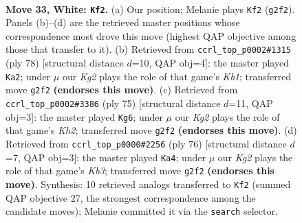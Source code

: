 \documentclass[11pt]{article}
\begin{document}
\clearpage

\begin{figure}[p]\centering
\begin{subfigure}{0.46\textwidth}\centering
\resizebox{\linewidth}{!}{%
\newchessgame
\chessboard[
  setfen={r7/6k1/8/8/p5p1/P7/6KP/R7 w - - 0 33},
  showmover=false,
  pgfstyle=straightmove, color=movearrow, markmove={g2-f2}
]}
\caption{}
\end{subfigure}\hfill
\begin{subfigure}{0.46\textwidth}\centering
\resizebox{\linewidth}{!}{%
\newchessgame
\chessboard[
  setfen={8/8/1k6/8/1p2r3/8/1PPR4/1K6 w - - 0 40},
  showmover=false,
  pgfstyle=straightmove, color=movearrow, markmove={b1-a2}
]}
\caption{}
\end{subfigure}
\\[4pt]
\begin{subfigure}{0.46\textwidth}\centering
\resizebox{\linewidth}{!}{%
\newchessgame
\chessboard[
  setfen={8/6pk/8/6Pp/R6P/1r6/5P1K/8 b - - 4 38},
  showmover=false,
  pgfstyle=straightmove, color=movearrow, markmove={h7-g6}
]}
\caption{}
\end{subfigure}\hfill
\begin{subfigure}{0.46\textwidth}\centering
\resizebox{\linewidth}{!}{%
\newchessgame
\chessboard[
  setfen={5k2/5p2/1pr5/8/1P6/1K6/4RP2/8 w - - 0 39},
  showmover=false,
  pgfstyle=straightmove, color=movearrow, markmove={b3-a4}
]}
\caption{}
\end{subfigure}
\caption{\textbf{Move 33, White: \texttt{Kf2}.} (a) Our position; Melanie plays \texttt{Kf2} (\texttt{g2f2}). Panels (b)--(d) are the retrieved master positions whose correspondence most drove this move (highest QAP objective among those that transfer to it). (b) Retrieved from \texttt{ccrl\_top\_p0002\#1315} (ply 78) [structural distance $d$=10, QAP obj=4]: the master played \texttt{Ka2}; under $\mu$ our \emph{Kg2} plays the role of that game's \emph{Kb1}; transferred move \texttt{g2f2} \textbf{(endorses this move)}. (c) Retrieved from \texttt{ccrl\_top\_p0002\#3386} (ply 75) [structural distance $d$=11, QAP obj=3]: the master played \texttt{Kg6}; under $\mu$ our \emph{Kg2} plays the role of that game's \emph{Kh2}; transferred move \texttt{g2f2} \textbf{(endorses this move)}. (d) Retrieved from \texttt{ccrl\_top\_p0000\#2256} (ply 76) [structural distance $d$=7, QAP obj=3]: the master played \texttt{Ka4}; under $\mu$ our \emph{Kg2} plays the role of that game's \emph{Kb3}; transferred move \texttt{g2f2} \textbf{(endorses this move)}. Synthesis: 10 retrieved analogs transferred to \texttt{Kf2} (summed QAP objective 27, the strongest correspondence among the candidate moves); Melanie committed it via the \texttt{search} selector.}
\label{fig:thought-m64}
\end{figure}
\end{document}
